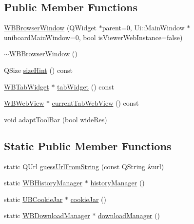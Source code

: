 \subsection*{Public Member Functions}
\begin{DoxyCompactItemize}
\item 
\hyperlink{class_w_b_browser_window_a3598ae963d79363f3c23455d1e1ccc08}{W\-B\-Browser\-Window} (Q\-Widget $\ast$parent=0, Ui\-::\-Main\-Window $\ast$uniboard\-Main\-Window=0, bool is\-Viewer\-Web\-Instance=false)
\item 
\hyperlink{class_w_b_browser_window_af7926c64998bf3ea9a6247eb7cd6fd4b}{$\sim$\-W\-B\-Browser\-Window} ()
\item 
Q\-Size \hyperlink{class_w_b_browser_window_a6b0f014fd7a552863fc2e518a72307ea}{size\-Hint} () const 
\item 
\hyperlink{class_w_b_tab_widget}{W\-B\-Tab\-Widget} $\ast$ \hyperlink{class_w_b_browser_window_ab4f8e1054be45e533c69aea40ef4458c}{tab\-Widget} () const 
\item 
\hyperlink{class_w_b_web_view}{W\-B\-Web\-View} $\ast$ \hyperlink{class_w_b_browser_window_a43b315ee4ca51f564a80369546af43de}{current\-Tab\-Web\-View} () const 
\item 
void \hyperlink{class_w_b_browser_window_a6162c62ac2fb2d54bd1ea40fb5b25def}{adapt\-Tool\-Bar} (bool wide\-Res)
\end{DoxyCompactItemize}
\subsection*{Static Public Member Functions}
\begin{DoxyCompactItemize}
\item 
static Q\-Url \hyperlink{class_w_b_browser_window_a8a5c6d4ceb45bde18872a41b63e1ba3c}{guess\-Url\-From\-String} (const Q\-String \&url)
\item 
static \hyperlink{class_w_b_history_manager}{W\-B\-History\-Manager} $\ast$ \hyperlink{class_w_b_browser_window_a6eba8c313cafdb6477060b52198e58e1}{history\-Manager} ()
\item 
static \hyperlink{class_u_b_cookie_jar}{U\-B\-Cookie\-Jar} $\ast$ \hyperlink{class_w_b_browser_window_a501f2fe903b8e88b97350171064a7713}{cookie\-Jar} ()
\item 
static \hyperlink{class_w_b_download_manager}{W\-B\-Download\-Manager} $\ast$ \hyperlink{class_w_b_browser_window_a93ae86b454649b8efc8e707503693226}{download\-Manager} ()
\end{DoxyCompactItemize}
